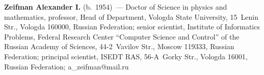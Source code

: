 \vspace*{3pt}

\noindent
\textbf{Zeifman Alexander I.} (b.\ 1954)~---
Doctor of Science in physics and mathematics, professor, Head of Department, 
Vologda State University, 15~Lenin Str., Vologda 160000, Russian Federation; 
senior scientist, Institute of Informatics Problems, Federal Research Center 
``Computer Science and Control'' of the Russian Academy of Sciences, 44-2~Vavilov Str., 
Moscow 119333, Russian Federation; principal scientist, 
ISEDT RAS, 56-A~Gorky Str., Vologda 16001, Russian Federation; a\_zeifman@mail.ru
\label{end\stat}


\renewcommand{\bibname}{\protect\rm Литература} 